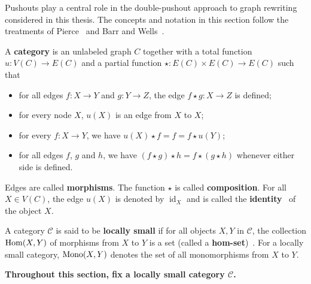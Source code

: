 Pushouts play a central role in the double-pushout approach to graph rewriting considered in this thesis. The concepts and notation in this section follow the treatments of Pierce~\cite{pierce1991basic} and Barr and Wells~\cite{barr1990category}.
\begin{definition}
    \label{def:cat}
    A \textbf{category} is an unlabeled graph \( C \) together with a total function \( u : V(C)  \mathop{\to} E(C) \) and a partial function \( \star: E(C) \mathop{\times} E(C)  \mathop{\to} E(C) \) such that 
        \begin{itemize}
            \item for all edges \( f:X  \mathop{\to} Y \) and \( g:Y  \mathop{\to} Z \), the edge \( f \mathop{\star} g :X  \mathop{\to} Z \) is defined; 
            \item  for every node \( X \), \( u(X) \) is an edge from \( X \) to \( X \); 
            \item for every \( f:X  \mathop{\to} Y \), we have \(u(X) \mathop{\star} f \mathop{=} f \mathop{=} f \mathop{\star} u(Y)\);
            \item for all edges \( f \), \( g \) and \(h\), we have \( (f \mathop{\star} g) \mathop{\star} h \mathop{=} f \mathop{\star} (g \mathop{\star} h) \) whenever either side is defined.
        \end{itemize}
    Edges are called \textbf{morphisms}. The function $\star$ is called \textbf{composition}. For all \( X \mathop{\in} V(C) \), the edge \( u(X) \) is denoted by \( \operatorname{id}_X \) and is called the \textbf{identity}~ of the object \( X \).
\end{definition}    
\begin{definition}
    A category \(\mathcal{C}\) is said to be \textbf{locally small} if for all objects \(X,Y\) in \(\mathcal{C}\), the collection $\operatorname{Hom}(X,Y)$ of morphisms from \(X\) to \(Y\) is a set (called a \textbf{hom-set})~. For a locally small category, $\operatorname{Mono}(X,Y)$ denotes the set of all monomorphisms from $X$ to $Y$.
\end{definition}
\textbf{Throughout this section, fix a locally small category \( \mathcal{C} \).}
